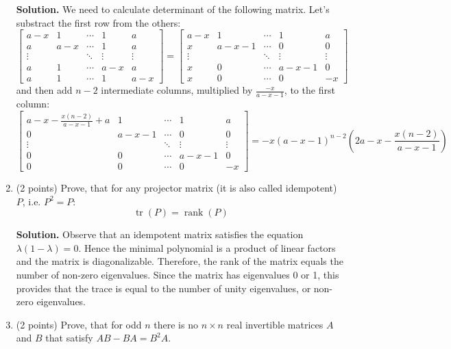\documentclass{article}
\begin{document}
\begin{enumerate}
  \textbf{Solution.} We need to calculate determinant of the following matrix.
  Let's substract the first row from the others:
  \[
  \begin{bmatrix}
    a-x & 1 & \cdots & 1 & a \\
    a & a-x & \cdots & 1 & a \\
    \vdots &  & \ddots & \vdots & \vdots \\
    a & 1 & \cdots & a-x & a \\
    a & 1 & \cdots & 1 & a-x
  \end{bmatrix} =
  \begin{bmatrix}
    a-x & 1 & \cdots & 1 & a \\
    x & a-x-1 & \cdots & 0 & 0 \\
    \vdots &  & \ddots & \vdots & \vdots \\
    x & 0 & \cdots & a-x-1 & 0 \\
    x & 0 & \cdots & 0 & -x
  \end{bmatrix}  
  \] 
  and then add $n-2$ intermediate columns, multiplied by $\frac{-x}{a-x-1}$, 
  to the first column:
  \[
    \begin{bmatrix}
      a-x-\frac{x(n-2)}{a-x-1}+a & 1 & \cdots & 1 & a \\
      0 & a-x-1 & \cdots & 0 & 0 \\
      \vdots &  & \ddots & \vdots & \vdots \\
      0 & 0 & \cdots & a-x-1 & 0 \\
      0 & 0 & \cdots & 0 & -x
    \end{bmatrix} = -x(a-x-1)^{n-2}\left(2a - x - \frac{x(n-2)}{a-x-1}\right)
  \]

    
  \item (2 points) Prove, that for any projector matrix (it is also called idempotent) $P$, i.e. $P^2 = P$:
   $$ \operatorname{tr} (P) = \operatorname{rank} (P)$$

   \textbf{Solution.} Observe that an idempotent matrix satisfies the equation 
   $\lambda(1 - \lambda) = 0$. Hence the minimal polynomial is a product of 
   linear factors and the matrix is diagonalizable. 
   Therefore, the rank of the matrix equals the number of non-zero eigenvalues. 
   Since the matrix has eigenvalues 0 or 1, this provides that 
   the trace is equal to the number of unity eigenvalues, 
   or non-zero eigenvalues.

  \item (2 points) Prove, that for odd $n$ there is no $n \times n$ real invertible 
  matrices $A$ and $B$ that satisfy $AB - BA = B^2A$.
  

\end{enumerate}
\end{document}
